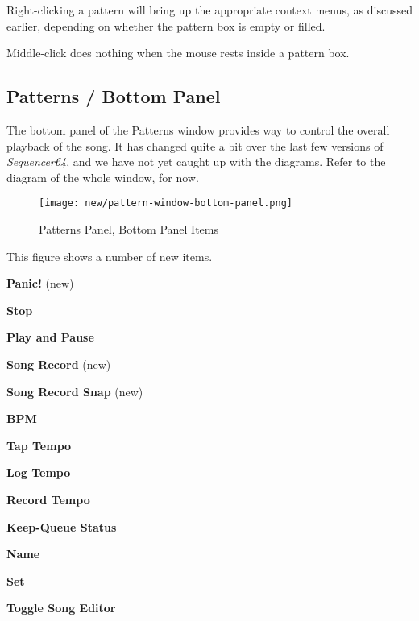    Right-clicking a pattern will bring up the appropriate context menus, as
   discussed earlier, depending on whether the pattern box is empty or
   filled.

   Middle-click does nothing when the mouse rests inside a pattern box.

\subsection{Patterns / Bottom Panel}
\label{subsec:seq64_patterns_panel_bottom}

   The bottom panel of the Patterns window provides way to control the
   overall playback of the song.  It has changed quite a bit over the last few
   versions of \textsl{Sequencer64}, and we have not yet caught up with the
   diagrams.  Refer to the diagram of the whole window, for now.

\begin{figure}[H]
   \centering 
   \texttt{[image: new/pattern-window-bottom-panel.png]}
   \caption{Patterns Panel, Bottom Panel Items}
   \label{fig:pattern_window_bottom_panel_items}
\end{figure}

   This figure shows a number of new items.

   \begin{enumber}
      \item \textbf{Panic!} (new)
      \item \textbf{Stop}
      \item \textbf{Play and Pause}
      \item \textbf{Song Record} (new)
      \item \textbf{Song Record Snap} (new)
      \item \textbf{BPM}
      \item \textbf{Tap Tempo}
      \item \textbf{Log Tempo}
      \item \textbf{Record Tempo}
      \item \textbf{Keep-Queue Status}
      \item \textbf{Name}
      \item \textbf{Set}
      \item \textbf{Toggle Song Editor}
   \end{enumber}

   \setcounter{ItemCounter}{0}      %

